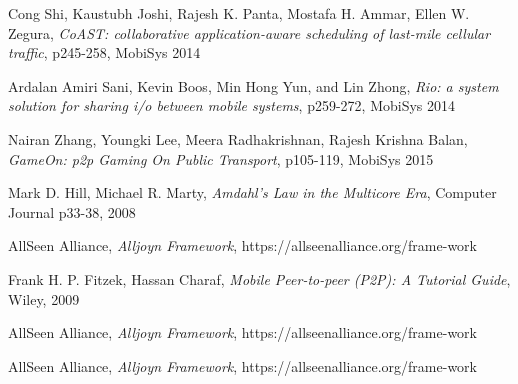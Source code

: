 \documentclass[conference]{IEEEtran}
\begin{document}
\begin{thebibliography}{100}
Cong Shi, Kaustubh Joshi, Rajesh K. Panta, Mostafa H. Ammar, Ellen W. Zegura, \emph{CoAST: collaborative application-aware scheduling of last-mile cellular traffic}, p245-258, MobiSys 2014

Ardalan Amiri Sani, Kevin Boos, Min Hong Yun, and Lin Zhong, \emph{Rio: a system solution for sharing i/o between mobile systems}, p259-272, MobiSys 2014

Nairan Zhang, Youngki Lee, Meera Radhakrishnan, Rajesh Krishna Balan, \emph{GameOn: p2p Gaming On Public Transport}, p105-119, MobiSys 2015

Mark D. Hill, Michael R. Marty, \emph{Amdahl's Law in the Multicore Era}, Computer Journal p33-38, 2008

AllSeen Alliance, \emph{Alljoyn Framework}, https://allseenalliance.org/frame-work

Frank H. P. Fitzek, Hassan Charaf, \emph{Mobile Peer-to-peer (P2P): A Tutorial Guide}, Wiley, 2009

AllSeen Alliance, \emph{Alljoyn Framework}, https://allseenalliance.org/frame-work

AllSeen Alliance, \emph{Alljoyn Framework}, https://allseenalliance.org/frame-work


\end{thebibliography}
\end{document}
